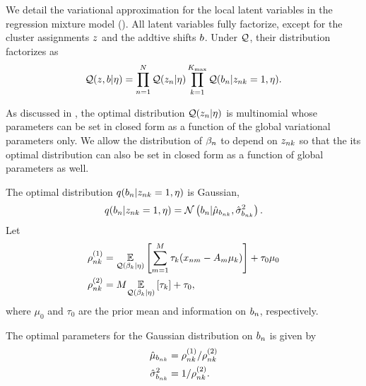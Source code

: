 We detail the variational approximation for the local
latent variables in the regression mixture model ().
All latent variables fully factorize, except for the cluster assignments $z$
and the addtive shifts $b$. Under $\mathcal{Q}$, their distribution factorizes as
\begin{align*}
  \mathcal{Q}(z, b \vert \eta) = \prod_{n = 1}^{N}\mathcal{Q}(z_n\vert\eta)
  \prod_{k = 1}^{{K_{\mathrm{max}}}} \mathcal{Q}(b_n\vert z_{nk} = 1, \eta).
\end{align*}

As discussed in ,
the optimal distribution $\mathcal{Q}(z_n\vert\eta)$ is multinomial whose parameters
can be set in closed form as a function of the global variational parameters only.
We allow the distribution of $\beta_n$ to depend on $z_{nk}$ so that
the its optimal distribution can also be set in closed form as a function of
global parameters as well.

The optimal distribution $q(b_n\vert z_{nk} = 1, \eta)$ is Gaussian,
\begin{align*}
q(b_n\vert z_{nk} = 1, \eta) = \mathcal{N}\left(b_n \vert \hat\mu_{b_{nk}}, \hat\sigma^2_{b_{nk}}\right).
\end{align*}
Let
\begin{align*}
  \rho^{(1)}_{nk} &= \underset{\mathcal{Q}(\beta_k|\eta)}{\mathbb{E}}\left[\sum_{m=1}^M \tau_{k}(x_{nm} - A_m\mu_k)\right] +
  \tau_0 \mu_0 \\
  \rho^{(2)}_{nk} &= M \underset{\mathcal{Q}(\beta_k|\eta)}{\mathbb{E}}\left[\tau_{k}\right] + \tau_0,
\end{align*}
where $\mu_0$ and $\tau_0$ are the prior mean and information on $b_n$, respectively.

The optimal parameters for the Gaussian distribution on $b_n$ is given by
\begin{align*}
  \hat\mu_{b_{nk}} &= \rho^{(1)}_{nk} / \rho^{(2)}_{nk}\\
  \hat\sigma^2_{b_{nk}} &= 1 / \rho^{(2)}_{nk}.
\end{align*}

